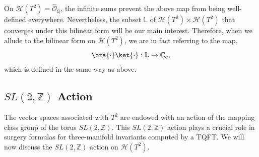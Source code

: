 \documentclass{article}
\newcommand{\Z}{{\mathbb Z}}
\newcommand{\C}{{\mathbb C}}
\newcommand{\Q}{{\mathbb Q}}
\numberwithin{corollary}{theorem}
\numberwithin{corollary}{proposition}
\begin{document}
On $\mathcal{H}(T^2) = \hat{\mathcal{O}}_\Q$, the infinite sums prevent the above map from being well-defined everywhere. Nevertheless, the subset $\mathbb{L}$ of $\mathcal{H}(T^2) \times \mathcal{H}(T^2)$ that converges under this bilinear form will be our main interest. Therefore, when we allude to the bilinear form on $\mathcal{H}(T^2)$, we are in fact referring to the map,
$$\bra{\cdot}\ket{\cdot}: \mathbb{L} \rightarrow \C_q , $$
which is defined in the same way as above. 







\subsection{\texorpdfstring{$SL(2,\mathbb{Z})$}{SL(2,Z)} Action}\label{sl2z_section}
The vector spaces associated with $T^{2}$ are endowed with an action of the mapping class group of the torus $SL(2,\Z)$. This $SL(2,\Z)$ action plays a crucial role in surgery formulas for three-manifold invariants computed by a TQFT. We will now discuss the $SL(2,\Z)$ action on $\mathcal{H}(T^{2})$. 
\end{document}
